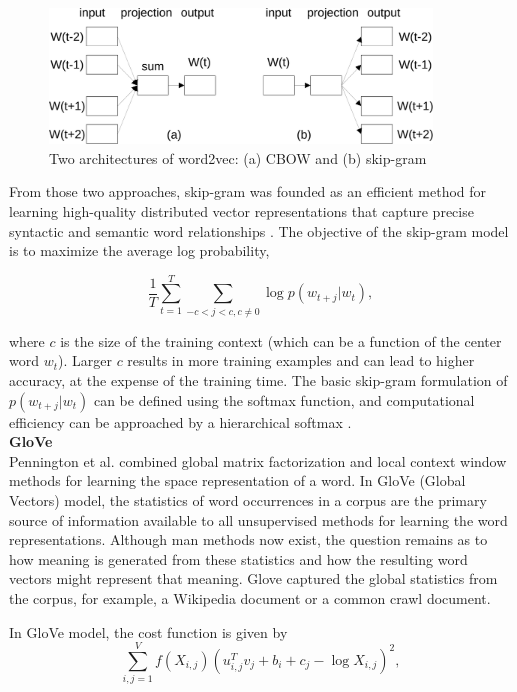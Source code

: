\begin{figure}
\centering
\includegraphics[width=4in]{../fig/word2vec-crop.pdf}
\caption{Two architectures of word2vec: (a) CBOW and (b) skip-gram \cite{Mikolov}}
\label{fig:word2vec}
\end{figure}

From those two approaches, skip-gram was founded as an efficient method for
learning high-quality distributed vector representations that capture precise
syntactic and semantic word relationships \cite{Mikolov}. The objective of the
skip-gram model is to maximize the average log probability,

\begin{equation}
\dfrac{1}{T}\sum_{t=1}^{T}\sum_{-c<j<c, c\neq0}\log p(w_{t+j}|w_t),
\label{eq:skipgram}
\end{equation}

\noindent where $c$ is the size of the training context (which can be a
function of the center word $w_t$). Larger $c$ results in more training
examples and can lead to higher accuracy, at the expense of the training time.
The basic skip-gram formulation of $p(w_{t+j} |w_t)$ can be defined using the
softmax function, and computational efficiency can be approached by a
hierarchical softmax \cite{Mikolov}. \\

\noindent \textbf{GloVe} \\
Pennington et al. \cite{Pennington2014} combined global matrix factorization
and local context window methods for learning the space representation of a
word.  In GloVe (Global Vectors) model, the statistics of word occurrences in a
corpus are the primary source of information available to all unsupervised
methods for learning the word representations. Although man methods now exist,
the question remains as to how meaning is generated from these statistics and
how the resulting word vectors might represent that meaning. Glove captured the
global statistics from the corpus, for example, a Wikipedia document or a
common crawl document. 

In GloVe model, the cost function is given by
\begin{equation}
\sum_{i,j=1}^{V}f(X_{i,j})(u_{i,j}^Tv_j+b_i+c_j-\log X_{i,j})^2,
\label{eq:glove}
\end{equation}

